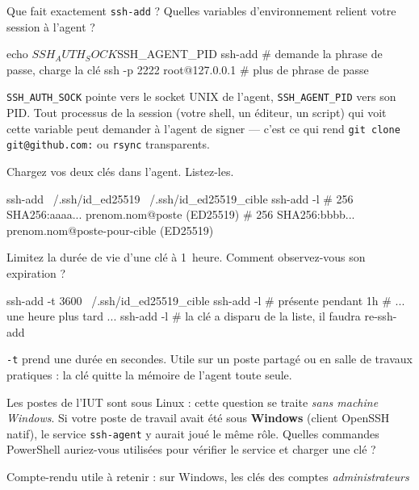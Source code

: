 \documentclass[a4paper,10pt]{exam}
\begin{document}
\begin{questions}
\question Que fait exactement \texttt{ssh-add} ? Quelles variables d'environnement relient
votre session à l'agent ?
\begin{solution}
\begin{bashcode}
echo $SSH_AUTH_SOCK $SSH_AGENT_PID
ssh-add                    # demande la phrase de passe, charge la clé
ssh -p 2222 root@127.0.0.1 # plus de phrase de passe
\end{bashcode}
\texttt{SSH\_AUTH\_SOCK} pointe vers le socket UNIX de l'agent, \texttt{SSH\_AGENT\_PID}
vers son PID. Tout processus de la session (votre shell, un éditeur, un script) qui voit
cette variable peut demander à l'agent de signer — c'est ce qui rend
\texttt{git clone git@github.com:} ou \texttt{rsync} transparents.
\end{solution}
\question Chargez vos deux clés dans l'agent. Listez-les.
\begin{solution}
\begin{bashcode}
ssh-add ~/.ssh/id_ed25519 ~/.ssh/id_ed25519_cible
ssh-add -l
# 256 SHA256:aaaa... prenom.nom@poste (ED25519)
# 256 SHA256:bbbb... prenom.nom@poste-pour-cible (ED25519)
\end{bashcode}
\end{solution}
\question Limitez la durée de vie d'une clé à 1~heure. Comment observez-vous son expiration ?
\begin{solution}
\begin{bashcode}
ssh-add -t 3600 ~/.ssh/id_ed25519_cible
ssh-add -l          # présente pendant 1h
# ... une heure plus tard ...
ssh-add -l          # la clé a disparu de la liste, il faudra re-ssh-add
\end{bashcode}
\texttt{-t} prend une durée en secondes. Utile sur un poste partagé ou en salle de travaux
pratiques : la clé quitte la mémoire de l'agent toute seule.
\end{solution}
\question Les postes de l'IUT sont sous Linux : cette question se traite \emph{sans
machine Windows}. Si votre poste de travail avait été sous \textbf{Windows} (client
OpenSSH natif), le service \texttt{ssh-agent} y aurait joué le même rôle. Quelles
commandes PowerShell auriez-vous utilisées pour vérifier le service et charger une clé ?
\begin{solution}
Compte-rendu utile à retenir : sur Windows, les clés des comptes \emph{administrateurs}

\end{solution}
\end{questions}
\end{document}
